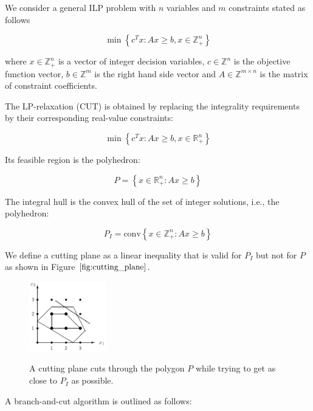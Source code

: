 \documentclass{SMBV12}
\begin{document}
We consider a general ILP problem with $n$ variables and $m$ constraints stated as follows

\begin{equation}
\min \left\lbrace c^Tx : Ax \geq b, x \in \mathbb{Z}_+^n \right\rbrace 
\end{equation}

where $x \in \mathbb{Z}_+^n$ is a vector of integer decision variables, $c \in \mathbb{Z}^n$ is the objective function vector, $b \in \mathbb{Z}^m$ is the right hand side vector and $A \in \mathbb{Z}^{m \times n}$ is the matrix of constraint coefficients.

The LP-relaxation (CUT) is obtained by replacing the integrality requirements by their corresponding real-value constraints:

\begin{equation}
\min \left\lbrace c^Tx : Ax \geq b, x \in \mathbb{R}_+^n \right\rbrace 
\end{equation}

Its feasible region is the polyhedron:

\begin{equation}
P = \left\lbrace x \in \mathbb{R}_+^n : Ax \geq b \right\rbrace 
\end{equation}

The integral hull is the convex hull of the set of integer solutions, i.e., the polyhedron:

\begin{equation}
P_I = \mbox{conv} \left\lbrace x \in \mathbb{Z}_+^n : Ax \geq b \right\rbrace 
\end{equation}

We define a cutting plane as a linear inequality that is valid for $P_I$ but not for $P$ as shown in Figure $\ref{fig:cutting_plane}$.
\begin{figure}[htbp]
\centering
\includegraphics[width=0.3\textwidth]{images/cutting_plane.png}
\label{fig:cutting_plane}
\caption{A cutting plane cuts through the polygon $P$ while trying to get as close to $P_I$ as possible.}
\end{figure}
A branch-and-cut algorithm is outlined as follows:
\end{document}
